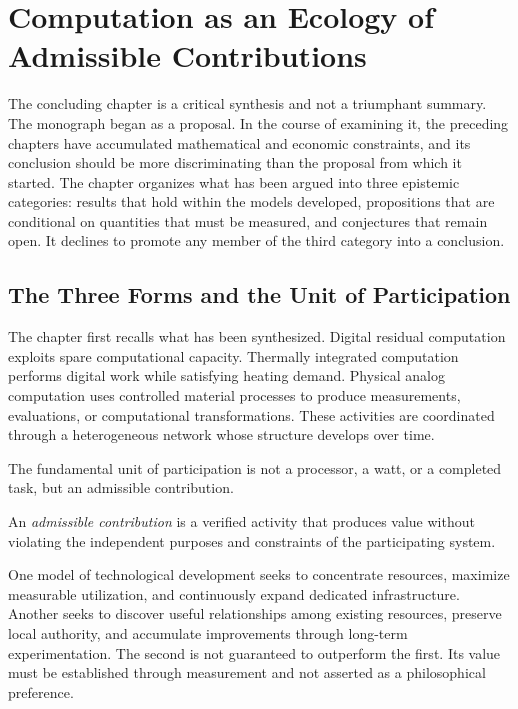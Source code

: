 \chapter[An Ecology of Admissible Contributions]{Computation as an Ecology of Admissible Contributions}
\label{ch:ecology}

The concluding chapter is a critical synthesis and not a triumphant summary. The monograph began as a proposal. In the course of examining it, the preceding chapters have accumulated mathematical and economic constraints, and its conclusion should be more discriminating than the proposal from which it started. The chapter organizes what has been argued into three epistemic categories: results that hold within the models developed, propositions that are conditional on quantities that must be measured, and conjectures that remain open. It declines to promote any member of the third category into a conclusion.

\section{The Three Forms and the Unit of Participation}

The chapter first recalls what has been synthesized. Digital residual computation exploits spare computational capacity. Thermally integrated computation performs digital work while satisfying heating demand. Physical analog computation uses controlled material processes to produce measurements, evaluations, or computational transformations. These activities are coordinated through a heterogeneous network whose structure develops over time.

The fundamental unit of participation is not a processor, a watt, or a completed task, but an admissible contribution.

\begin{definition}
\label{def:admissible}
An \emph{admissible contribution} is a verified activity that produces value without violating the independent purposes and constraints of the participating system.
\end{definition}

One model of technological development seeks to concentrate resources, maximize measurable utilization, and continuously expand dedicated infrastructure. Another seeks to discover useful relationships among existing resources, preserve local authority, and accumulate improvements through long-term experimentation. The second is not guaranteed to outperform the first. Its value must be established through measurement and not asserted as a philosophical preference.

